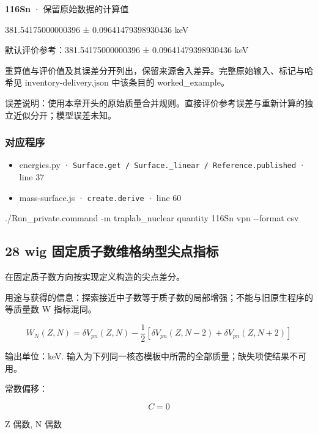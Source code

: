 \documentclass[
  11pt,
  letterpaper,
]{article}
\newenvironment{Shaded}{}{}
\newcommand{\AttributeTok}[1]{\textcolor[rgb]{0.49,0.56,0.16}{#1}}
\newcommand{\ExtensionTok}[1]{#1}
\newcommand{\NormalTok}[1]{#1}
\providecommand{\tightlist}{%
  \setlength{\itemsep}{0pt}\setlength{\parskip}{0pt}}
\begin{document}
\textbf{116Sn} · 保留原始数据的计算值

381.54175000000396 ± 0.09641479398930436 keV

默认评价参考：381.54175000000396 ± 0.09641479398930436 keV

重算值与评价值及其误差分开列出，保留来源舍入差异。完整原始输入、标记与哈希见
inventory-delivery.json 中该条目的 worked\_example。

误差说明：使用本章开头的原始质量合并规则。直接评价参考误差与重新计算的独立近似分开；模型误差未知。

\subsubsection{对应程序}\label{ux5bf9ux5e94ux7a0bux5e8f-26}

\begin{itemize}
\tightlist
\item
  energies.py ·
  \texttt{Surface.get\ /\ Surface.\_linear\ /\ Reference.published} ·
  line 37
\item
  mass-surface.js · \texttt{create.derive} · line 60
\end{itemize}

\begin{Shaded}
\begin{Highlighting}[]
\ExtensionTok{./Run\_private.command} \AttributeTok{{-}m}\NormalTok{ traplab\_nuclear quantity 116Sn vpn }\AttributeTok{{-}{-}format}\NormalTok{ csv}
\end{Highlighting}
\end{Shaded}

\subsection{28 wig
固定质子数维格纳型尖点指标}\label{wig-ux56faux5b9aux8d28ux5b50ux6570ux7ef4ux683cux7eb3ux578bux5c16ux70b9ux6307ux6807}

在固定质子数方向按实现定义构造的尖点差分。

用途与获得的信息：探索接近中子数等于质子数的局部增强；不能与旧原生程序的等质量数
W 指标混同。

\[
W_N(Z,N)=\delta V_{pn}(Z,N)-\frac12[\delta V_{pn}(Z,N-2)+\delta V_{pn}(Z,N+2)]
\]

输出单位：keV.
输入为下列同一核态模板中所需的全部质量；缺失项使结果不可用。

常数偏移：

\[
C=0
\]

Z 偶数, N 偶数
\end{document}
